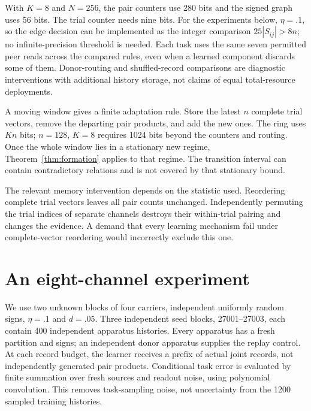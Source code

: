 \documentclass[11pt]{article}
\theoremstyle{definition}
\theoremstyle{remark}
\begin{document}
With $K=8$ and $N=256$, the pair counters use 280 bits and the signed graph uses 56 bits. The trial counter needs nine bits. For the experiments below, $\eta=.1$, so the edge decision can be implemented as the integer comparison $25|S_{ij}|>8n$; no infinite-precision threshold is needed. Each task uses the same seven permitted peer reads across the compared rules, even when a learned component discards some of them. Donor-routing and shuffled-record comparisons are diagnostic interventions with additional history storage, not claims of equal total-resource deployments.

A moving window gives a finite adaptation rule. Store the latest $n$ complete trial vectors, remove the departing pair products, and add the new ones. The ring uses $Kn$ bits; $n=128$, $K=8$ requires 1024 bits beyond the counters and routing. Once the whole window lies in a stationary new regime, Theorem~\ref{thm:formation} applies to that regime. The transition interval can contain contradictory relations and is not covered by that stationary bound.

The relevant memory intervention depends on the statistic used. Reordering complete trial vectors leaves all pair counts unchanged. Independently permuting the trial indices of separate channels destroys their within-trial pairing and changes the evidence. A demand that every learning mechanism fail under complete-vector reordering would incorrectly exclude this one.

\section{An eight-channel experiment}
\label{sec:numerics}

We use two unknown blocks of four carriers, independent uniformly random signs, $\eta=.1$ and $d=.05$. Three independent seed blocks, 27001--27003, each contain 400 independent apparatus histories. Every apparatus has a fresh partition and signs; an independent donor apparatus supplies the replay control. At each record budget, the learner receives a prefix of actual joint records, not independently generated pair products. Conditional task error is evaluated by finite summation over fresh sources and readout noise, using polynomial convolution. This removes task-sampling noise, not uncertainty from the 1200 sampled training histories.
\end{document}
